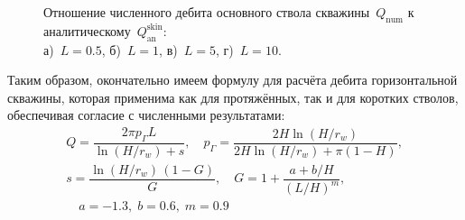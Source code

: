 \documentclass{article}
\begin{document}
\begin{figure}[H]
	\centering
	\begin{subfigure}{0.48\textwidth}
		
		\caption{}
		\label{fig:kham_hw_pipe_edge_effect_L0.5_r_approx}
	\end{subfigure}
	\hfill
	\begin{subfigure}{0.48\textwidth}
		
		\caption{}
		\label{fig:kham_hw_pipe_edge_effect_L1_r_approx}
	\end{subfigure}

	\begin{subfigure}{0.48\textwidth}
		
		\caption{}
		\label{fig:kham_hw_pipe_edge_effect_L5_r_approx}
	\end{subfigure}
	\hfill
	\begin{subfigure}{0.48\textwidth}
		
		\caption{}
		\label{fig:kham_hw_pipe_edge_effect_L10_r_approx}
	\end{subfigure}

	\caption{
		Отношение численного дебита основного ствола скважины~$Q_{\text{num}}$ к аналитическому~$Q_{\text{an}}^{\text{skin}}$: \\
		а)~$L=0.5$, б)~$L=1$, в)~$L=5$, г)~$L=10$.
	}
	\label{fig:kham_hw_pipe_edge_effects_r_approx}
\end{figure}

Таким образом, окончательно имеем формулу для расчёта дебита горизонтальной скважины,
которая применима как для протяжённых, так и для коротких стволов, обеспечивая согласие с численными результатами:
\begin{equation}
	\displaystyle
	\begin{gathered}
		Q = \dfrac{2 \pi p_{\Gamma} L}{\ln \left( H / r_w \right) + s}, \quad
		p_{\Gamma} = \dfrac{2 H \ln{\left(H/r_w\right)}}{2 H \ln{\left(H/r_w\right)
				+ \pi \left(1 - H\right)}}, \\[6pt] %
		s = \dfrac{\ln \left( H / r_w \right)\,\left(1 - G\right)}{G}, \quad
		G = 1 + \dfrac{a + b/H}{\left(L/H\right)^{m}}, \\ %
		\quad a=-1.3,\; b=0.6,\; m=0.9
	\end{gathered}
	\label{eq:hw_final_Q}
\end{equation}
\end{document}
